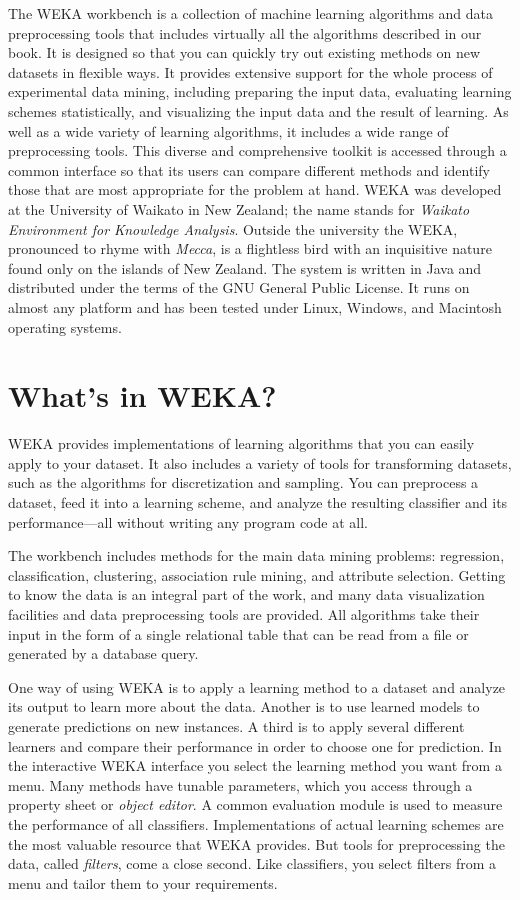 The WEKA workbench is a collection of machine learning algorithms and
data preprocessing tools that includes virtually all the algorithms
described in our book. It is designed so that you can quickly try out
existing methods on new datasets in flexible ways. It provides
extensive support for the whole process of experimental data mining,
including preparing the input data, evaluating learning schemes
statistically, and visualizing the input data and the result of
learning. As well as a wide variety of learning algorithms, it
includes a wide range of preprocessing tools. This diverse and
comprehensive toolkit is accessed through a common interface so that
its users can compare different methods and identify those that are
most appropriate for the problem at hand.  WEKA was developed at the
University of Waikato in New Zealand; the name stands for {\em Waikato
Environment for Knowledge Analysis}. Outside the university the WEKA,
pronounced to rhyme with {\em Mecca}, is a flightless bird with an
inquisitive nature found only on the islands of New Zealand. The
system is written in Java and distributed under the terms of the GNU
General Public License. It runs on almost any platform and has been
tested under Linux, Windows, and Macintosh operating systems.

\section{What's in WEKA?}

WEKA provides implementations of learning algorithms that you can
easily apply to your dataset. It also includes a variety of tools for
transforming datasets, such as the algorithms for discretization and
sampling. You can preprocess a dataset, feed it into a learning
scheme, and analyze the resulting classifier and its performance---all
without writing any program code at all.

The workbench includes methods for the main data mining problems:
regression, classification, clustering, association rule mining, and
attribute selection. Getting to know the data is an integral part of
the work, and many data visualization facilities and data
preprocessing tools are provided. All algorithms take their input in
the form of a single relational table that can be read from a file or
generated by a database query.

One way of using WEKA is to apply a learning method to a dataset and
analyze its output to learn more about the data. Another is to use
learned models to generate predictions on new instances. A third is to
apply several different learners and compare their performance in
order to choose one for prediction. In the interactive WEKA interface
you select the learning method you want from a menu. Many methods have
tunable parameters, which you access through a property sheet or
{\em object editor}. A common evaluation module is used to measure the
performance of all classifiers.  Implementations of actual learning
schemes are the most valuable resource that WEKA provides. But tools
for preprocessing the data, called {\em filters}, come a close second. Like
classifiers, you select filters from a menu and tailor them to your
requirements.

